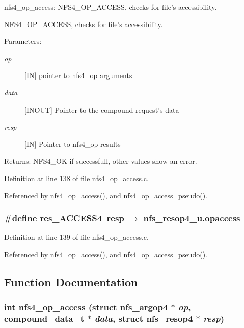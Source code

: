 nfs4\_\-op\_\-access: NFS4\_\-OP\_\-ACCESS, checks for file's accessibility.

NFS4\_\-OP\_\-ACCESS, checks for file's accessibility.

\begin{Desc}
\item[Parameters:]
\begin{description}
\item[{\em op}][IN] pointer to nfs4\_\-op arguments \item[{\em data}][INOUT] Pointer to the compound request's data \item[{\em resp}][IN] Pointer to nfs4\_\-op results\end{description}
\end{Desc}
\begin{Desc}
\item[Returns:]NFS4\_\-OK if successfull, other values show an error. \end{Desc}


Definition at line 138 of file nfs4\_\-op\_\-access.c.

Referenced by nfs4\_\-op\_\-access(), and nfs4\_\-op\_\-access\_\-pseudo().
\subsubsection{\setlength{\rightskip}{0pt plus 5cm}\#define res\_\-ACCESS4\ resp $\rightarrow$ nfs\_\-resop4\_\-u.opaccess}\label{nfs4__op__access_8c_a1}




Definition at line 139 of file nfs4\_\-op\_\-access.c.

Referenced by nfs4\_\-op\_\-access(), and nfs4\_\-op\_\-access\_\-pseudo().

\subsection{Function Documentation}
\subsubsection{\setlength{\rightskip}{0pt plus 5cm}int nfs4\_\-op\_\-access (struct nfs\_\-argop4 $\ast$ {\em op}, compound\_\-data\_\-t $\ast$ {\em data}, struct nfs\_\-resop4 $\ast$ {\em resp})}\label{nfs4__op__access_8c_a2}




